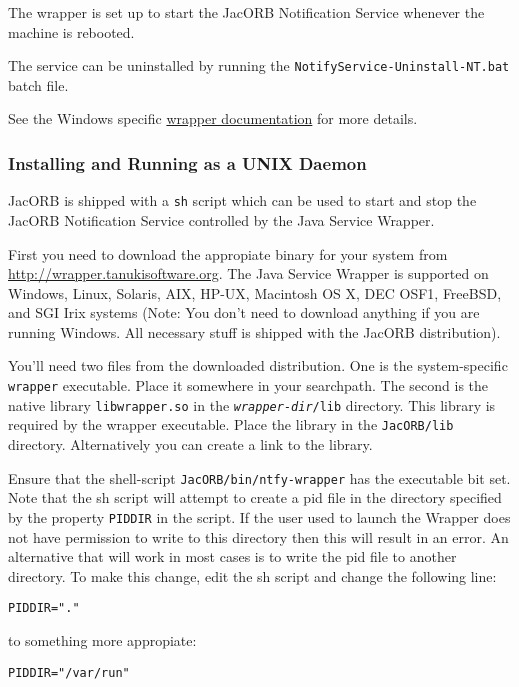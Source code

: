 The wrapper is set up to start the JacORB Notification Service
whenever the machine is rebooted.

The service can be uninstalled by running the
\texttt{NotifyService-Uninstall-NT.bat} batch file.

See the Windows specific
\href{http://wrapper.tanukisoftware.org/doc/english/launch-win.html}{wrapper
  documentation} for more details.
  

\subsubsection{Installing and Running as a UNIX Daemon}
\label{sec:inst-runn-as}

JacORB is shipped with a \texttt{sh} script which can be used to start
and stop the JacORB Notification Service controlled by the Java
Service Wrapper.

First you need to download the appropiate binary for your system from
\href{http://wrapper.tanukisoftware.org}{http://wrapper.tanukisoftware.org}.
The Java Service Wrapper is supported on Windows, Linux, Solaris, AIX,
HP-UX, Macintosh OS X, DEC OSF1, FreeBSD, and SGI Irix systems (Note:
You don't need to download anything if you are running Windows. All
necessary stuff is shipped with the JacORB distribution).

You'll need two files from the downloaded distribution. One is
the system-specific \texttt{wrapper} executable. Place it somewhere in
your searchpath. The second is the native library
\texttt{libwrapper.so} in the \texttt{\emph{wrapper-dir}/lib}
directory. This library is required by the 
wrapper executable. Place the library in the \texttt{JacORB/lib}
directory. Alternatively you can create a link to the library.

Ensure that the shell-script
\texttt{JacORB/bin/ntfy-wrapper} has the executable bit set. Note that
the sh script will attempt to create a pid file in the directory
specified by the property \texttt{PIDDIR} in the script. If
the user used to launch the Wrapper does not have permission to write
to this directory then this will result in an error. An alternative
that will work in most cases is to write the pid file to another
directory. To make this change, edit the sh  script and change the following line: 

\begin{verbatim}
PIDDIR="."
\end{verbatim}
to something more appropiate:
\begin{verbatim}
PIDDIR="/var/run"
\end{verbatim}


